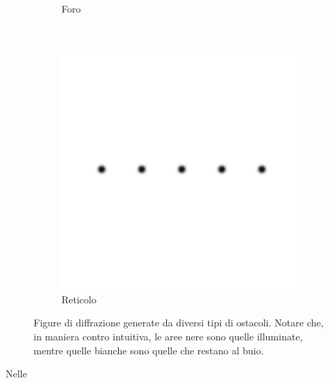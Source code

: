 \begin{figure}[t]
\begin{subfigure}[b]{0.3\textwidth}
        \caption{Foro}
        \label{fig:foro}
    \end{subfigure}
    ~ %
    \begin{subfigure}[b]{0.3\textwidth}
        \includegraphics[width=\textwidth]{f3.png}
        \caption{Reticolo}
        \label{fig:ret}
    \end{subfigure}
    \caption{Figure di diffrazione generate da diversi tipi di ostacoli. Notare che, in maniera contro intuitiva,
        le aree nere sono quelle illuminate, mentre quelle bianche sono quelle che restano al buio.}
    \label{fig:diff}
\end{figure}

Nelle

